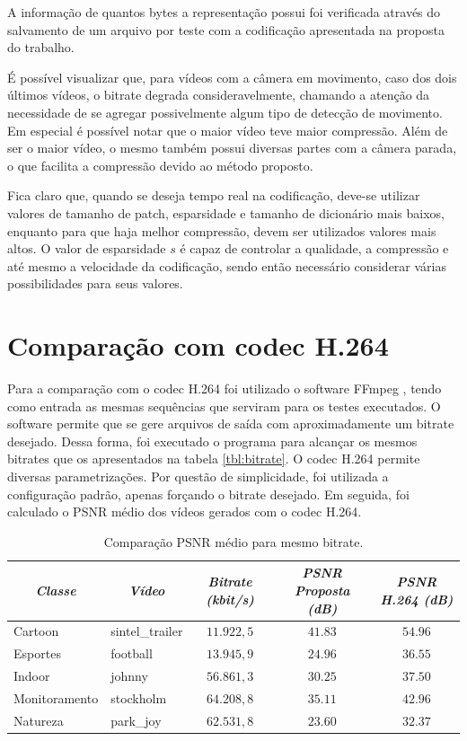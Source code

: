 \documentclass[cic,tc]{iiufrgs}
\begin{document}
A informação de quantos bytes a representação possui foi verificada através do salvamento
de um arquivo por teste com a codificação apresentada na proposta do trabalho.

É possível visualizar que, para vídeos com a câmera em movimento, caso dos dois últimos vídeos,
o bitrate degrada consideravelmente, chamando a atenção da necessidade de se agregar possivelmente
algum tipo de detecção de movimento.
Em especial é possível notar que o maior vídeo teve maior compressão.
Além de ser o maior vídeo, o mesmo também possui diversas partes com a câmera parada, 
o que facilita a compressão devido ao método proposto.

Fica claro que, quando se deseja tempo real na codificação, deve-se utilizar valores 
de tamanho de patch, esparsidade e tamanho de dicionário mais baixos, enquanto para que haja melhor compressão, 
devem ser utilizados valores mais altos.
O valor de esparsidade $s$ é capaz de controlar a qualidade, a compressão e até mesmo a velocidade 
da codificação, sendo então necessário considerar várias possibilidades para seus valores.

\section{Comparação com codec H.264}
Para a comparação com o codec H.264 foi utilizado o software FFmpeg \cite{FFmpeg}, tendo como entrada
as mesmas sequências que serviram para os testes executados. 
O software permite que se gere arquivos de saída com aproximadamente um bitrate desejado.
Dessa forma, foi executado o programa para alcançar os mesmos bitrates que os apresentados 
na tabela \ref{tbl:bitrate}.
O codec H.264 permite diversas parametrizações.
Por questão de simplicidade, foi utilizada a configuração padrão, apenas forçando o bitrate desejado.
Em seguida, foi calculado o PSNR médio dos vídeos gerados com o codec H.264.

\begin{table}[h]
    \caption{Comparação PSNR médio para mesmo bitrate.}
    \centering
        \begin{tabular}{|l|l|c|c|c|}
          \hline
          \multicolumn{1}{|c}{\textit{Classe}} & 
          \multicolumn{1}{|c}{\textit{Vídeo}} & 
          \multicolumn{1}{|c|}{\textit{Bitrate (kbit/s)}} &
          \multicolumn{1}{|c}{\textit{PSNR Proposta (dB)}} & 
          \multicolumn{1}{|c|}{\textit{PSNR H.264 (dB)}} \\
          \hline
          \hline
          Cartoon & sintel\_trailer & $11.922,5$ & $41.83$ & $54.96$ \\
          Esportes & football & $13.945,9$ & $24.96$ & $36.55$ \\
          Indoor & johnny & $56.861,3$ & $30.25$ & $37.50$ \\
          Monitoramento & stockholm & $64.208,8$ & $35.11$ & $42.96$ \\
          Natureza & park\_joy & $62.531,8$ & $23.60$ & $32.37$ \\
          \hline
        \end{tabular}
    \label{tbl:bitrateh264}
\end{table}
\end{document}
